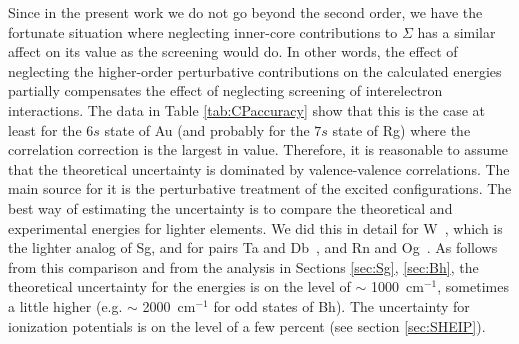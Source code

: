 \documentclass[10pt,a4paper, twoside]{report}
\begin{document}
Since in the present work we do not go beyond the second order, we have the fortunate situation where neglecting inner-core contributions to $\Sigma$ has a similar affect on its value as the screening would do. In other words, the effect of neglecting the higher-order perturbative contributions on
the calculated energies partially compensates the effect of neglecting
screening of interelectron interactions. The data in Table \ref{tab:CPaccuracy} show that this is the case at least for the
$6s$ state of Au (and probably for the $7s$ state of Rg) where the correlation correction
is the largest in value. Therefore, it is reasonable to assume that the theoretical uncertainty is dominated by valence-valence correlations. The main source for it is the perturbative treatment of the excited configurations. The best way of estimating the uncertainty is to compare the theoretical and experimental energies for lighter elements. We did this in detail for W~\cite{DBHF2017}, which is the lighter analog of Sg, and for pairs Ta and Db~\cite{LDFDb2018}, and Rn and Og~\cite{LDFOg2018}. As follows from this comparison and from the analysis in Sections \ref{sec:Sg}, \ref{sec:Bh}, the theoretical uncertainty for the energies is on the level of $\sim$ 1000~cm$^{-1}$, sometimes a little higher (e.g.  $\sim$ 2000~cm$^{-1}$ for odd states of Bh). The uncertainty for ionization potentials is on the level of a few percent (see section \ref{sec:SHEIP}).
\end{document}
